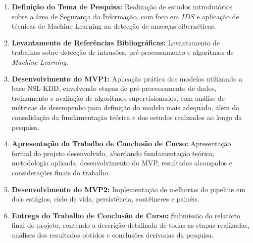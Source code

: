 \documentclass[a4paper,10pt, twocolumn]{article}
\begin{document}
\begin{enumerate}
	\item \textbf{Definição do Tema de Pesquisa:} Realização de estudos introdutórios sobre a área de Segurança da Informação, com foco em $IDS$ e aplicação de técnicas de Machine Learning na detecção de ameaças cibernéticas.
	\item \textbf{Levantamento de Referências Bibliográficas:} Levantamento de trabalhos sobre detecção de intrusões, pré-processamento e algoritmos de \textit{Machine Learning}.
	\item \textbf{Desenvolvimento do MVP1:} Aplicação prática dos modelos utilizando a base NSL-KDD, envolvendo etapas de pré-processamento de dados, treinamento e avaliação de algoritmos supervisionados, com análise de métricas de desempenho para definição do modelo mais adequado, além da consolidação da fundamentação teórica e dos estudos realizados ao longo da pesquisa.
	\item \textbf{Apresentação do Trabalho de Conclusão de Curso:} Apresentação formal do projeto desenvolvido, abordando fundamentação teórica, metodologia aplicada, desenvolvimento do MVP, resultados alcançados e considerações finais do trabalho.
	\item \textbf{Desenvolvimento do MVP2:} Implementação de melhorias do pipeline em dois estágios, ciclo de vida, persistência, contêineres e painéis.
	\item \textbf{Entrega do Trabalho de Conclusão de Curso:} Submissão do relatório final do projeto, contendo a descrição detalhada de todas as etapas realizadas, análises dos resultados obtidos e conclusões derivadas da pesquisa.
\end{enumerate}
\end{document}
